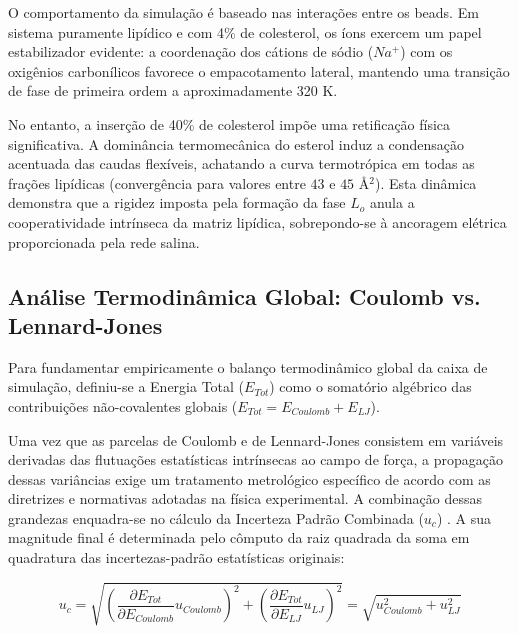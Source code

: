 O comportamento da simulação é baseado nas interações entre os beads. Em sistema puramente lipídico e com 4\% de colesterol, os íons exercem um papel estabilizador evidente: a coordenação dos cátions de sódio ($Na^+$) com os oxigênios carbonílicos favorece o empacotamento lateral, mantendo uma transição de fase de primeira ordem a aproximadamente 320 K. 

No entanto, a inserção de 40\% de colesterol impõe uma retificação física significativa. A dominância termomecânica do esterol induz a condensação acentuada das caudas flexíveis, achatando a curva termotrópica em todas as frações lipídicas (convergência para valores entre $43$ e $45$ \AA$^2$). Esta dinâmica demonstra que a rigidez imposta pela formação da fase $L_o$ anula a cooperatividade intrínseca da matriz lipídica, sobrepondo-se à ancoragem elétrica proporcionada pela rede salina.



\subsection{Análise Termodinâmica Global: Coulomb vs. Lennard-Jones}

Para fundamentar empiricamente o balanço termodinâmico global da caixa de simulação, definiu-se a Energia Total ($E_{Tot}$) como o somatório algébrico das contribuições não-covalentes globais ($E_{Tot} = E_{Coulomb} + E_{LJ}$). 

Uma vez que as parcelas de Coulomb e de Lennard-Jones consistem em variáveis derivadas das flutuações estatísticas intrínsecas ao campo de força, a propagação dessas variâncias exige um tratamento metrológico específico de acordo com as diretrizes e normativas adotadas na física experimental. A combinação dessas grandezas enquadra-se no cálculo da Incerteza Padrão Combinada ($u_c$) \cite{kallner2001uncertainty}. A sua magnitude final é determinada pelo cômputo da raiz quadrada da soma em quadratura das incertezas-padrão estatísticas originais:

\begin{equation}
    u_{c} = \sqrt{\left(\frac{\partial E_{Tot}}{\partial E_{Coulomb}} u_{Coulomb}\right)^2 + \left(\frac{\partial E_{Tot}}{\partial E_{LJ}} u_{LJ}\right)^2} = \sqrt{u_{Coulomb}^2 + u_{LJ}^2}
\end{equation}

